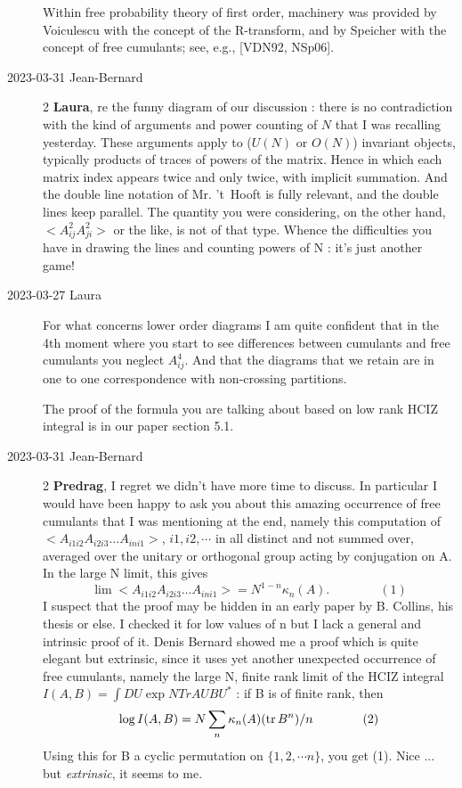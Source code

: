 \begin{description}
Within free probability theory of first order, machinery was provided by
Voiculescu with the concept of the R-transform, and by Speicher with the
concept of free cumulants; see, e.g., [VDN92, NSp06].
%

   \item[2023-03-31 Jean-Bernard]
2 \textbf{Laura}, re the funny diagram of our discussion : there is no contradiction
with the kind of arguments and power counting of $N$ that I was recalling yesterday.
These arguments apply to ($U(N)$ or $O(N)$) invariant objects, typically products of traces
of powers of the matrix. Hence in which each matrix index appears twice and only twice,
with implicit summation. And the double line notation of Mr. 't~Hooft  is fully relevant,
and the double lines keep parallel.
The quantity you were considering, on the other hand,
$< A_{ij}^2 A_{ji}^2>$ or the like, is not of that type. Whence the difficulties you have
in drawing the lines and counting powers of N : it's just another game!

   \item[2023-03-27 Laura]
For what concerns lower order diagrams I am quite confident that in the 4th
moment where you start to see differences between cumulants and free
cumulants you neglect $A_{ij}^4$. And that the diagrams that we retain are in one
to one correspondence with non-crossing partitions.

The proof of the formula you are talking about based on low rank HCIZ integral is in our paper
 section 5.1.

   \item[2023-03-31 Jean-Bernard]
2 \textbf{Predrag}, I regret we didn't have more time to discuss. In particular I would have been
happy to ask you about this amazing occurrence of free cumulants that I was
mentioning at the end, namely  this computation of $< A_{i1 i2} A_{i2 i3}… A_{in i1}>$,
$i1, i2, \cdots$ in all distinct and not summed over, averaged over the unitary or orthogonal
group acting by conjugation on A. In the large N limit, this gives
\[
\lim   < A_{i1 i2} A_{i2 i3}… A_{in i1}> = N^{1-n} \kappa_n(A).  \qquad\qquad  (1)
\]
I suspect that the proof may be hidden in an early paper by B. Collins, his thesis or
else. I checked it for low values of n but I lack a general and intrinsic proof of it.
Denis Bernard showed me a proof which is quite elegant but extrinsic, since it uses
yet another unexpected occurrence of free cumulants, namely the large N, finite rank
limit of the HCIZ integral $I(A,B) =\int DU  \exp N Tr A U B U^*$  : if B is of finite rank, then
\[
\log I(A,B) = N \sum_n     \kappa_n(A) (\mathrm{tr}\, B^n)  /n    \qquad\qquad  (2)
\]
Using this for B a cyclic permutation on $\{1,2,\cdots n\}$, you get   (1).
Nice ... but {\em extrinsic}, it seems to me.


\end{description}
